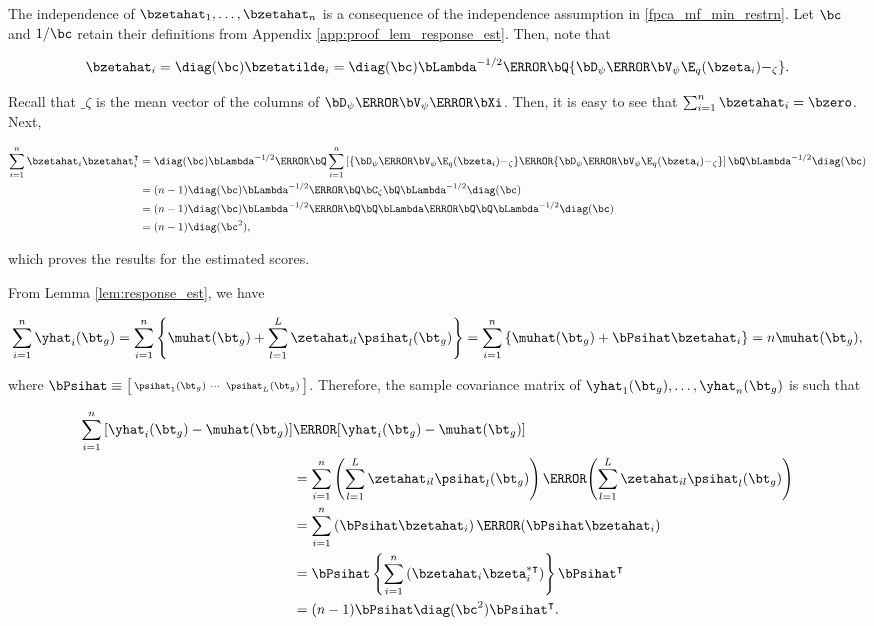 \documentclass[12pt]{article}
\theoremstyle{plain}
\theoremstyle{definition}
\theoremstyle{remark}
\begin{document}
The independence of $\bzetahat_1, \dots, \bzetahat_n$ is a consequence of the independence assumption in
\eqref{fpca_mf_min_restrn}. Let $\bc$ and $1/\bc$ retain their definitions from Appendix
\ref{app:proof_lem_response_est}. Then, note that

\[
	\bzetahat_i
		= \diag (\bc) \bzetatilde_i
		= \diag (\bc) \bLambda^{-1/2} \T{\bQ} \{ \bD_\psi \T{\bV_\psi} \E_q (\bzeta_i) - \bm_\zeta \}.
\]

\noindent Recall that $\bm_\zeta$ is the mean vector of the columns of $\bD_\psi \T{\bV_\psi} \T{\bXi}$.
Then, it is easy to see that $\sum_{i=1}^n \bzetahat_i = \bzero$. Next,

\begin{align*}
	\sum_{i=1}^n \bzetahat_i \bzetahat^{\intercal}_i
		&= \diag (\bc) \bLambda^{-1/2} \T{\bQ}
			\sum_{i=1}^n \left[
				\{ \bD_\psi \T{\bV_\psi} \E_q (\bzeta_i) - \bm_\zeta \}
					\T{\{ \bD_\psi \T{\bV_\psi} \E_q (\bzeta_i) - \bm_\zeta \}}
			\right]
			\bQ \bLambda^{-1/2} \diag (\bc) \\
		&= (n - 1) \diag (\bc) \bLambda^{-1/2} \T{\bQ} \bC_\zeta \bQ \bLambda^{-1/2} \diag (\bc) \\
		&= (n - 1) \diag (\bc) \bLambda^{-1/2} \T{\bQ} \bQ \bLambda \T{\bQ} \bQ \bLambda^{-1/2} \diag (\bc) \\
		&= (n - 1) \diag (\bc^2),
\end{align*}

\noindent which proves the results for the estimated scores.

From Lemma \ref{lem:response_est}, we have

\[
	\sum_{i=1}^n \yhat_i (\bt_g)
		= \sum_{i=1}^n \left\{ \muhat (\bt_g) + \sum_{l=1}^L \zetahat_{il} \psihat_l (\bt_g) \right\}
		= \sum_{i=1}^n \left\{ \muhat (\bt_g) + \bPsihat \bzetahat_i \right\}
		= n \muhat (\bt_g),
\]

\noindent where $\bPsihat \equiv \bigl[ \begin{smallmatrix} \psihat_1 (\bt_g) & \cdots & \psihat_L (\bt_g)
\end{smallmatrix} \bigr]$.
Therefore, the sample covariance matrix of $\yhat_1 (\bt_g), \dots, \yhat_n (\bt_g)$ is such that

\begin{align*}
	\sum_{i=1}^n \left[ \yhat_i (\bt_g) - \muhat (\bt_g) \right] & \T{\left[ \yhat_i (\bt_g) - \muhat (\bt_g) \right]} \\
		&= \sum_{i=1}^n \left(
			\sum_{l=1}^L \zetahat_{il} \psihat_l (\bt_g)
		\right) \T{\left(
			\sum_{l=1}^L \zetahat_{il} \psihat_l (\bt_g)
		\right)} \\
		&= \sum_{i=1}^n \left( \bPsihat \bzetahat_i \right) \T{\left( \bPsihat \bzetahat_i \right)} \\
		&= \bPsihat \left\{ \sum_{i=1}^n \left( \bzetahat_i \bzeta^{*\intercal}_i \right) \right\} \bPsihat^{\intercal} \\
		&= (n - 1) \bPsihat \diag (\bc^2) \bPsihat^{\intercal}.
\end{align*}
\end{document}
